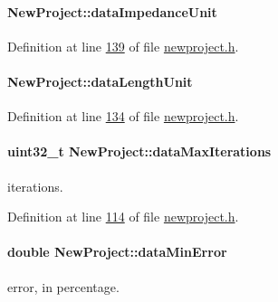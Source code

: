 \hypertarget{class_new_project_ae50ce899e9b67db0001a11044730a778}{}
\paragraph[{data\+Impedance\+Unit}]{ New\+Project\+::data\+Impedance\+Unit}\label{class_new_project_ae50ce899e9b67db0001a11044730a778}


Definition at line \hyperlink{newproject_8h_source_l00139}{139} of file \hyperlink{newproject_8h_source}{newproject.\+h}.

\hypertarget{class_new_project_ac0bf8b4f04f5c9425c74dd980711f021}{}
\paragraph[{data\+Length\+Unit}]{ New\+Project\+::data\+Length\+Unit}\label{class_new_project_ac0bf8b4f04f5c9425c74dd980711f021}


Definition at line \hyperlink{newproject_8h_source_l00134}{134} of file \hyperlink{newproject_8h_source}{newproject.\+h}.

\hypertarget{class_new_project_a42e0ddd47dd58e3634ec274e7af00ba9}{}
\paragraph[{data\+Max\+Iterations}]{\setlength{\rightskip}{0pt plus 5cm}uint32\+\_\+t New\+Project\+::data\+Max\+Iterations}\label{class_new_project_a42e0ddd47dd58e3634ec274e7af00ba9}
iterations. 

Definition at line \hyperlink{newproject_8h_source_l00114}{114} of file \hyperlink{newproject_8h_source}{newproject.\+h}.

\hypertarget{class_new_project_a186c2163239625faf8c7769a72fa988c}{}
\paragraph[{data\+Min\+Error}]{\setlength{\rightskip}{0pt plus 5cm}double New\+Project\+::data\+Min\+Error}\label{class_new_project_a186c2163239625faf8c7769a72fa988c}
error, in percentage. 

